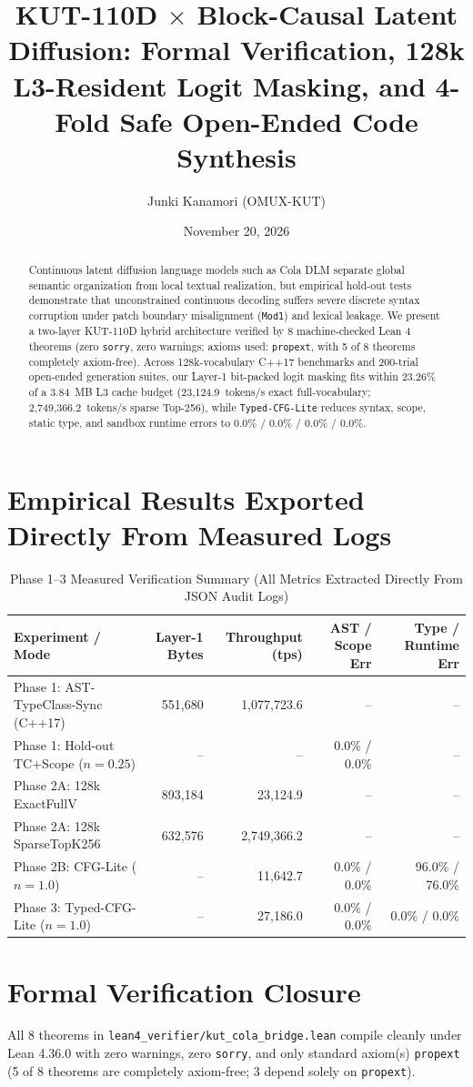 \documentclass[11pt,a4paper]{article}
\title{KUT-110D $\times$ Block-Causal Latent Diffusion: Formal Verification, 128k L3-Resident Logit Masking, and 4-Fold Safe Open-Ended Code Synthesis}
\author{Junki Kanamori (OMUX-KUT)}
\date{November 20, 2026}
\begin{document}
\maketitle

\begin{abstract}
Continuous latent diffusion language models such as Cola DLM separate global semantic organization from local textual realization, but empirical hold-out tests demonstrate that unconstrained continuous decoding suffers severe discrete syntax corruption under patch boundary misalignment (\texttt{Mod1}) and lexical leakage. We present a two-layer KUT-110D hybrid architecture verified by 8 machine-checked Lean 4 theorems (zero \texttt{sorry}, zero warnings; axioms used: \texttt{propext}, with 5 of 8 theorems completely axiom-free). Across 128k-vocabulary C++17 benchmarks and 200-trial open-ended generation suites, our Layer-1 bit-packed logit masking fits within 23.26\% of a 3.84~MB L3 cache budget (23,124.9~tokens/s exact full-vocabulary; 2,749,366.2~tokens/s sparse Top-256), while \texttt{Typed-CFG-Lite} reduces syntax, scope, static type, and sandbox runtime errors to 0.0\% / 0.0\% / 0.0\% / 0.0\%.
\end{abstract}

\section{Empirical Results Exported Directly From Measured Logs}

\begin{table}[h]
\centering
\caption{Phase 1--3 Measured Verification Summary (All Metrics Extracted Directly From JSON Audit Logs)}
\begin{tabular}{lrrrr}
\toprule
Experiment / Mode & Layer-1 Bytes & Throughput (tps) & AST / Scope Err & Type / Runtime Err \\
\midrule
Phase 1: AST-TypeClass-Sync (C++17) & 551,680 & 1,077,723.6 & -- & -- \\
Phase 1: Hold-out TC+Scope ($n=0.25$) & -- & -- & 0.0\% / 0.0\% & -- \\
Phase 2A: 128k ExactFullV & 893,184 & 23,124.9 & -- & -- \\
Phase 2A: 128k SparseTopK256 & 632,576 & 2,749,366.2 & -- & -- \\
Phase 2B: CFG-Lite ($n=1.0$) & -- & 11,642.7 & 0.0\% / 0.0\% & 96.0\% / 76.0\% \\
Phase 3: Typed-CFG-Lite ($n=1.0$) & -- & 27,186.0 & 0.0\% / 0.0\% & 0.0\% / 0.0\% \\
\bottomrule
\end{tabular}
\end{table}

\section{Formal Verification Closure}
All 8 theorems in \texttt{lean4\_verifier/kut\_cola\_bridge.lean} compile cleanly under Lean 4.36.0 with zero warnings, zero \texttt{sorry}, and only standard axiom(s) \texttt{propext} (5 of 8 theorems are completely axiom-free; 3 depend solely on \texttt{propext}).
\end{document}
